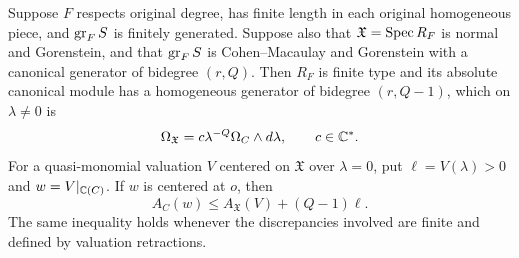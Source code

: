 \begin{lemma}\label{filt:discrepancy}
Suppose $F$ respects original degree, has finite length in each original
homogeneous piece, and $\operatorname{gr}_F S$ is finitely generated.  Suppose also
that $\mathfrak X=\operatorname{Spec} R_F$ is normal and Gorenstein, and that
$\operatorname{gr}_F S$ is Cohen--Macaulay and Gorenstein with a canonical generator
of bidegree $(r,Q)$.  Then $R_F$ is finite type and its absolute canonical
module has a homogeneous generator of bidegree $(r,Q-1)$, which on
$\lambda\ne0$ is
\begin{equation}\label{filt:canonical-form}
 \Omega_{\mathfrak X}
   =c\lambda^{-Q}\Omega_C\wedge d\lambda,
 \qquad c\in\mathbb C^*.
\end{equation}
For a quasi-monomial valuation $V$ centered on $\mathfrak X$ over
$\lambda=0$, put $\ell=V(\lambda)>0$ and
$w=V|_{\mathbb C(C)}$.  If $w$ is centered at $o$, then
\begin{equation}\label{filt:discrepancy-inequality}
 A_C(w)\leq A_{\mathfrak X}(V)+(Q-1)\ell.
\end{equation}
The same inequality holds whenever the discrepancies involved are
finite and defined by valuation retractions.
\end{lemma}

